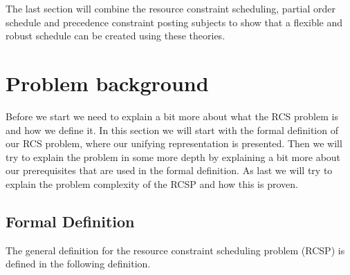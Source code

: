 \documentclass{article}
\begin{document}
The last section will combine the resource constraint scheduling, partial order schedule and precedence constraint posting subjects to show that a flexible and robust schedule can be created using these theories. 

\newpage

\section{Problem background}
Before we start we need to explain a bit more about what the RCS problem is and how we define it.
In this section we will start with the formal definition of our RCS problem, where our unifying representation is presented.
Then we will try to explain the problem in some more depth by explaining a bit more about our prerequisites that are used in the formal definition.
As last we will try to explain the problem complexity of the RCSP and how this is proven.


\subsection{Formal Definition}
The general definition for the resource constraint scheduling problem (RCSP) is defined in the following definition\cite{brucker99}.
\end{document}
